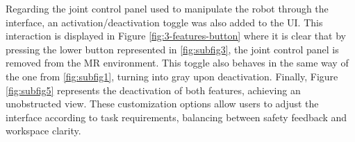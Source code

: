 Regarding the joint control panel used to manipulate the robot through the interface, an activation/deactivation toggle was also added to the \ac{UI}. This interaction is displayed in Figure \ref{fig:3-features-button} where it is clear that by pressing the lower button represented in \ref{fig:subfig3}, the joint control panel is removed from the \ac{MR} environment. This toggle also behaves in the same way of the one from \ref{fig:subfig1}, turning into gray upon deactivation. 
Finally, Figure \ref{fig:subfig5} represents the deactivation of both features, achieving an unobstructed view. These customization options allow users to adjust the interface according to task requirements, balancing between safety feedback and workspace clarity.





